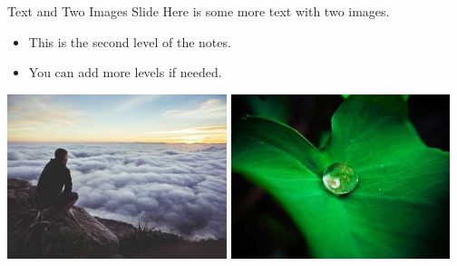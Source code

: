 \documentclass[aspectratio=169, notes]{beamer}
\begin{document}
\begin{frame}[shrink]{Text and Two Images Slide}
    Here is some more text with two images.
    \begin{itemize}
        \item This is the second level of the notes.
        \item You can add more levels if needed.
    \end{itemize}

    \includegraphics[width=0.48\textwidth]{Images/image1.jpg}
    \includegraphics[width=0.48\textwidth]{Images/image2.jpg}

    \vspace*{1cm}


\end{frame}
\end{document}
